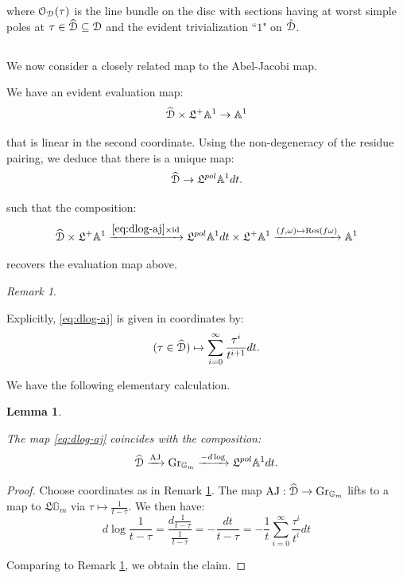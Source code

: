 \documentclass[reqno,11pt]{amsart}
\numberwithin{equation}{subsection}
\newtheorem{lem}[thm]{Lemma}
\theoremstyle{remark}
\newtheorem{rem}[thm]{Remark}
\newcommand{\xar}[1]{\xrightarrow{#1}}
\newcommand{\bA}{{\mathbb A}}
\newcommand{\bG}{{\mathbb G}}
\newcommand{\sD}{{\EuScript D}}
\newcommand{\sO}{{\EuScript O}}
\newcommand{\fL}{{\mathfrak L}}
\newcommand{\on}{\operatorname}
\newcommand{\id}{\on{id}}
\newcommand{\Res}{\on{Res}}
\newcommand{\Gr}{\on{Gr}}
\newcommand{\AJ}{\on{AJ}}
\renewcommand{\o}[1]{\mathring{#1}}
\renewcommand{\subset}{\subseteq}
\begin{document}
\noindent where $\sO_{\sD}(\tau)$ is the line bundle on 
the disc with sections having at worst simple
poles at $\tau \in \widehat{\sD} \subset \sD$
and the evident trivialization ``$1$" on $\o{\sD}$.

\subsection{}\label{ss:dlog-aj}

We now consider a closely related map to the Abel-Jacobi map.

We have an evident evaluation map:
%
\begin{equation}\label{eq:ev-a1}
\widehat{\sD} \times \fL^+ \bA^1 \to \bA^1
\end{equation}

\noindent that is linear in the second coordinate.
Using the non-degeneracy of the residue pairing, 
we deduce that there is a unique map:
%
\begin{equation}\label{eq:dlog-aj}
\widehat{\sD} \to
\fL^{pol} \bA^1 dt.
\end{equation}

\noindent such that the composition:
%
\[
\widehat{\sD} \times \fL^+ \bA^1 
\xar{\eqref{eq:dlog-aj} \times \id}
\fL^{pol} \bA^1 dt \times 
\fL^+ \bA^1 \xar{(f,\omega) \mapsto \Res(f\omega)} 
\bA^1
\]

\noindent recovers the evaluation map above.

\begin{rem}\label{r:dlog-aj-fmla}

Explicitly, \eqref{eq:dlog-aj} is given in coordinates
by:
%
\[
(\tau \in \widehat{\sD}) \mapsto \sum_{i = 0}^{\infty}
\frac{\tau^i}{t^{i+1}} dt.
\]

\end{rem}

We have the following elementary calculation.

\begin{lem}\label{l:dlog-aj}

The map \eqref{eq:dlog-aj} coincides with the composition:
%
\[
\widehat{\sD} \xar{\AJ} \Gr_{\bG_m} 
\xar{-d\log} \fL^{pol} \bA^1 dt.
\]

\end{lem}

\begin{proof}

Choose coordinates as in Remark \ref{r:dlog-aj-fmla}.
The map $\AJ:\widehat{\sD} \to \Gr_{\bG_m}$ lifts to a 
map to $\fL\bG_m$ via $\tau \mapsto \frac{1}{t-\tau}$.
We then have:
%
\[
d\log \frac{1}{t-\tau} = 
\frac{d\frac{1}{t-\tau}}{\frac{1}{t-\tau}} = 
-\frac{dt}{t-\tau} = -\frac{1}{t}\sum_{i = 0}^{\infty} \frac{\tau^i}{t^i} dt
\]

\noindent Comparing to Remark \ref{r:dlog-aj-fmla}, we obtain the 
claim.

\end{proof}
\end{document}
